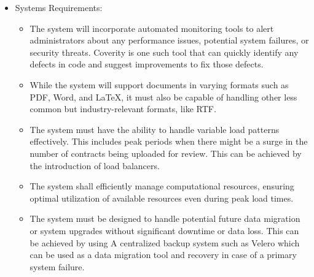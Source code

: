 \begin{itemize}
\begin{itemize}
    \end{itemize}
    \item Systems Requirements: 
    \begin{itemize}
        \item The system will incorporate automated monitoring tools to alert administrators about any performance issues, potential system failures, or security threats. Coverity is one such tool that can quickly identify any defects in code and suggest improvements to fix those defects. 
        \item While the system will support documents in varying formats such as PDF, Word, and LaTeX, it must also be capable of handling other less common but industry-relevant formats, like RTF.
        \item The system must have the ability to handle variable load patterns effectively. This includes peak periods when there might be a surge in the number of contracts being uploaded for review. This can be achieved by the introduction of load balancers.
        \item The system shall efficiently manage computational resources, ensuring optimal utilization of available resources even during peak load times.
        \item The system must be designed to handle potential future data migration or system upgrades without significant downtime or data loss. This can be achieved by using A centralized backup system such as Velero which can be used as a data migration tool and recovery in case of a primary system failure. 











\end{itemize}
\end{itemize}
